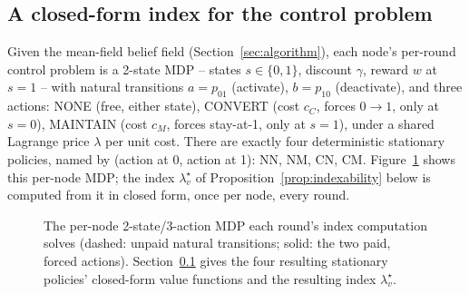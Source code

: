 \documentclass[journal]{IEEEtran}
\begin{document}
\subsection{A closed-form index for the control problem}
\label{sec:index}

Given the mean-field belief field (Section~\ref{sec:algorithm}), each
node's per-round control problem is a 2-state MDP -- states
$s\in\{0,1\}$, discount $\gamma$, reward $w$ at $s=1$ -- with natural
transitions $a=p_{01}$ (activate), $b=p_{10}$ (deactivate), and three
actions: NONE (free, either state), CONVERT (cost $c_C$, forces $0\to1$,
only at $s=0$), MAINTAIN (cost $c_M$, forces stay-at-1, only at $s=1$),
under a shared Lagrange price $\lambda$ per unit cost. There are exactly
four deterministic stationary policies, named by (action at 0, action at
1): NN, NM, CN, CM. Figure~\ref{fig:mdp} shows this per-node MDP; the
index $\lambda^\star_v$ of Proposition~\ref{prop:indexability} below is
computed from it in closed form, once per node, every round.

\begin{figure}[t]
\centering
{}
\caption{The per-node 2-state/3-action MDP each round's index computation
solves (dashed: unpaid natural transitions; solid: the two paid, forced
actions). Section~\ref{sec:index} gives the four resulting stationary
policies' closed-form value functions and the resulting index
$\lambda^\star_v$.}
\label{fig:mdp}
\end{figure}
\end{document}
